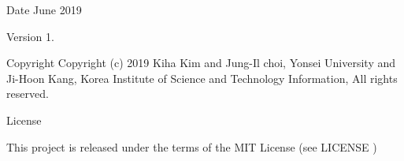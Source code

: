 \begin{DoxyDate}{Date}
June 2019 
\end{DoxyDate}
\begin{DoxyVersion}{Version}
1. 
\end{DoxyVersion}
\begin{DoxyParagraph}{Copyright}
Copyright (c) 2019 Kiha Kim and Jung-\/\+Il choi, Yonsei University and Ji-\/\+Hoon Kang, Korea Institute of Science and Technology Information, All rights reserved. 
\end{DoxyParagraph}
\begin{DoxyParagraph}{License }

\end{DoxyParagraph}
This project is released under the terms of the M\+IT License (see L\+I\+C\+E\+N\+SE ) 